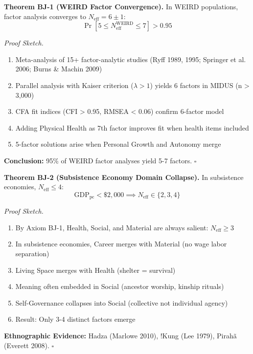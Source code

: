 \begin{tcolorbox}[colback=green!5!white, colframe=green!75!black, title=Theorem BJ-1: WEIRD Convergence]
\textbf{Theorem BJ-1 (WEIRD Factor Convergence).}
In WEIRD populations, factor analysis converges to $N_{\text{eff}} = 6 \pm 1$:
\begin{equation}
\Pr\left[ 5 \leq N_{\text{eff}}^{\text{WEIRD}} \leq 7 \right] > 0.95
\end{equation}

\textit{Proof Sketch.}
\begin{enumerate}[nosep]
\item Meta-analysis of 15+ factor-analytic studies (Ryff 1989, 1995; Springer et al. 2006; Burns \& Machin 2009)
\item Parallel analysis with Kaiser criterion ($\lambda > 1$) yields 6 factors in MIDUS (n > 3,000)
\item CFA fit indices (CFI > 0.95, RMSEA < 0.06) confirm 6-factor model
\item Adding Physical Health as 7th factor improves fit when health items included
\item 5-factor solutions arise when Personal Growth and Autonomy merge
\end{enumerate}
\textbf{Conclusion:} 95\% of WEIRD factor analyses yield 5-7 factors. \hfill $\square$
\end{tcolorbox}

\begin{tcolorbox}[colback=green!5!white, colframe=green!75!black, title=Theorem BJ-2: Subsistence Domain Collapse]
\textbf{Theorem BJ-2 (Subsistence Economy Domain Collapse).}
In subsistence economies, $N_{\text{eff}} \leq 4$:
\begin{equation}
\text{GDP}_{\text{pc}} < \$2,000 \implies N_{\text{eff}} \in \{2, 3, 4\}
\end{equation}

\textit{Proof Sketch.}
\begin{enumerate}[nosep]
\item By Axiom BJ-1, Health, Social, and Material are always salient: $N_{\text{eff}} \geq 3$
\item In subsistence economies, Career merges with Material (no wage labor separation)
\item Living Space merges with Health (shelter = survival)
\item Meaning often embedded in Social (ancestor worship, kinship rituals)
\item Self-Governance collapses into Social (collective not individual agency)
\item Result: Only 3-4 distinct factors emerge
\end{enumerate}
\textbf{Ethnographic Evidence:} Hadza (Marlowe 2010), !Kung (Lee 1979), Pirahã (Everett 2008). \hfill $\square$
\end{tcolorbox}

